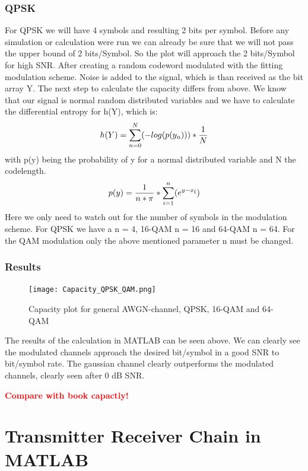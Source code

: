 \documentclass[12pt,oneside, reqno]{report}
\newcommand\boldred[1]{\textcolor{red}{\textbf{#1}}}
\begin{document}
\subsection{QPSK}
For QPSK we will have 4 symbols and resulting 2 bits per symbol. Before any simulation or calculation were run we can already be sure that we will not pass the upper bound of 2 bits/Symbol. So the plot will approach the 2 bits/Symbol for high SNR.
After creating a random codeword modulated with the fitting modulation scheme. Noise is added to the signal, which is than received as the bit array Y. The next step to calculate the capacity differs from above. 
\newline
We know that our signal is normal random distributed variables and we have to calculate the differential entropy for h(Y), which is: 
\begin{equation}
\label{eq:entropy}
h(Y) =  \sum_{n=0}^N(-log(p(y\textsubscript{n}))) * \frac{1}{N}
\end{equation} 
with p(y) being the probability of y for a normal distributed variable and N the codelength.
\begin{equation}
p(y) = \frac{1}{n*\pi}*\sum_{i=1}^n(e^{y-x\textsubscript{i}})
\end{equation} 
Here we only need to watch out for the number of symbols in the modulation scheme. For QPSK we have a n = 4, 16-QAM n = 16 and 64-QAM n = 64.
\newline
For the QAM modulation only the above mentioned parameter n must be changed.
 

\subsection{Results}
\begin{figure}[H]
	\centering
	\texttt{[image: Capacity\_QPSK\_QAM.png]}
	\caption{Capacity plot for general AWGN-channel, QPSK, 16-QAM and 64-QAM}
	\label{fig:Modulation}
\end{figure}
The results of the calculation in MATLAB can be seen above. We can clearly see the modulated channels approach the desired bit/symbol in a good SNR to bit/symbol rate. The gaussian channel clearly outperforms the modulated channels, clearly seen after 0 dB SNR.

\boldred{Compare with book capactiy!}


\chapter{Transmitter Receiver Chain in MATLAB}
\end{document}
